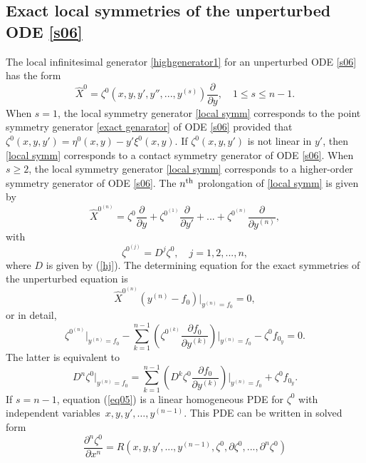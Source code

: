 \documentclass[11pt,letter,subeqn]{article}
\begin{document}
\subsection{Exact local symmetries of the unperturbed ODE \eqref{s06}}
  The local infinitesimal generator \eqref{highgenerator1} for an unperturbed ODE \eqref{s06} has the form
  \begin{equation}\label{local symm}
    \hat{X}^{0}=\zeta^0(x,y,y',y'',...,y^{(s)})\dfrac{\partial}{\partial y},\quad 1\leq s\leq n-1.
  \end{equation}
  When $s=1$, the local symmetry generator \eqref{local symm} corresponds to the point symmetry generator \eqref{exact genarator} of ODE \eqref{s06} provided that $\zeta^0(x,y,y')=\eta^0(x,y)-y'\xi^0(x,y)$. If $\zeta^0(x,y,y')$ is not linear in $y'$, then \eqref{local symm} corresponds to a contact symmetry generator of ODE \eqref{s06}. When $s\geq2$, the local symmetry generator \eqref{local symm} corresponds to a higher-order symmetry generator of ODE \eqref{s06}.
  The $n^{\rm th}$ prolongation of \eqref{local symm} is given by
  \[
    \hat{X}^{0^{(n)}}=\zeta^0\dfrac{\partial}{\partial y}+\zeta^{0^{(1)}}\dfrac{\partial}{\partial y'}+...+\zeta^{0^{(n)}} \dfrac{\partial}{\partial y^{(n)}},
  \]
  with
  \begin{equation}\label{eq3}
    \zeta^{0^{(j)}}=D^j\zeta^0,\quad j=1,2,...,n,
  \end{equation}
  where $D$ is given by (\ref{hj}). The determining equation for the exact symmetries of the unperturbed equation is
  \begin{equation}\label{z7}
   \hat{X}^{0^{(n)}}(y^{(n)}-f_0)\bigg|_{y^{(n)}=f_0}=0,
   \end{equation}
   or in detail,
   \begin{equation}\label{eq4}
    \zeta^{0^{(n)}}\bigg|_{y^{(n)}=f_0}-\sum_{k=1}^{n-1}\left(\zeta^{0^{(k)}}\frac{\partial f_0}{\partial y^{(k)} }\right) \bigg|_{y^{(n)}=f_0}- \zeta^0 f_{0_y}=0.
   \end{equation}
   The latter is equivalent to
   \begin{equation}\label{eq05}
    D^n \zeta^{0}\bigg|_{y^{(n)}=f_0}=\sum_{k=1}^{n-1}\left(D^{k}\zeta^{0}\frac{\partial f_0}{\partial y^{(k)}}\right) \bigg|_{y^{(n)}=f_0}+ \zeta^0 f_{0_y}.
   \end{equation}
   If $s=n-1$, equation (\ref{eq05}) is a linear homogeneous PDE for $\zeta^0$ with independent variables\, $x,y,y',\ldots, y^{(n-1)}$. This PDE can be written in solved form
   \begin{equation}\label{solved form}
     \dfrac{\partial^n \zeta^0 }{\partial x^n}=R(x,y,y',..., y^{(n-1)},\zeta^0,\partial \zeta^0,...,\partial^n \zeta^0)
   \end{equation}
\end{document}
